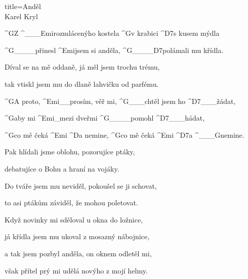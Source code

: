 \begin{song}{title=\predtitle \centering Anděl \\\large Karel Kryl   \vspace*{-0.3cm}}  %
\begin{centerjustified}
\nejnejvetsi
\sloka 
	^{G}Z ^{{\color{white}\_\_\_}Emi}rozmlácenýho kostela ^{G}v krabici ^{D7}s kusem mýdla

	^{G{\color{white}\_\_\_\_}}přinesl ^{Emi}jsem si anděla, ^{G{\color{white}\_\_\_\_}D7}polámali mu křídla.

	Díval se na mě oddaně, já měl jsem trochu trému,

	tak vtiskl jsem mu do dlaně lahvičku od parfému.

	^{G}A proto, ^{Emi{\color{white}\_\_}}prosím, věř mi, ^{G{\color{white}\_\_\_}}chtěl jsem ho ^{D7{\color{white}\_\_\_}}žádat,
	
	^{G}aby mi ^{Emi{\color{white}\_}}mezi dveřmi ^{G{\color{white}\_\_\_\_}}pomohl ^{D7{\color{white}\_\_\_}}hádat,

	^{G}co mě čeká ^{Emi} ^{D}a nemine, ^{G}co mě čeká ^{Emi} ^{D7}a    ^{{\color{white}\_\_\_}G}nemine.

\sloka
	Pak hlídali jsme oblohu, pozorujíce ptáky,
	
	debatujíce o Bohu a hraní na vojáky.

	Do tváře jsem mu neviděl, pokoušel se ji schovat,

	to asi ptákům záviděl, že mohou poletovat.


\sloka
	Když novinky mi sděloval u okna do ložnice,

	já křídla jsem mu ukoval z mosazný nábojnice,
	
	a tak jsem pozbyl anděla, on oknem odletěl mi,

	však přítel prý mi udělá novýho z mojí helmy.


\end{centerjustified}
\setcounter{Slokočet}{0}
\end{song}
